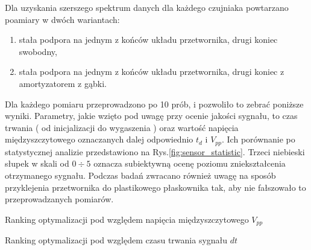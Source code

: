 Dla uzyskania szerszego spektrum danych dla każdego czujniaka powtarzano poamiary w dwóch wariantach: 
\begin{enumerate}
\item stała podpora na jednym z końców układu przetwornika, drugi koniec swobodny,
\item stała podpora na jednym z końców układu przetwornika, drugi koniec z amortyzatorem z gąbki.
\end{enumerate}
Dla każdego pomiaru przeprowadzono po 10 prób, i pozwoliło to zebrać poniższe wyniki. Parametry, jakie wzięto pod uwagę przy ocenie jakości sygnału, to czas trwania ( od inicjalizacji do wygaszenia ) oraz wartość napięcia międzyszczytowego oznaczanych dalej odpowiednio $t_d$ i $V_{pp}$. Ich porównanie po statystycznej analizie przedstawiono na Rys.\ref{fig:sensor_statistic}. Trzeci niebieski słupek w skali od $0\div5$ oznacza subiektywną ocenę poziomu zniekształcenia otrzymanego sygnału. Podczas badań zwracano również uwagę na sposób przyklejenia przetwornika do plastikowego płaskownika tak, aby nie fałszowało to przeprowadzanych pomiarów. 


\sensorSelTab

\begin{table}[htbp]
  \caption{Ranking optymalizacji pod względem napięcia międzyszczytowego $V_{pp}$}
  \label{fig:sensor_selection_rank_vpp}

  \centering
\end{table}

\begin{table}[htbp]
  \caption{Ranking optymalizacji pod względem czasu trwania sygnału $dt$}
  \label{fig:sensor_selection_rank_dt}

  \centering
\end{table}

